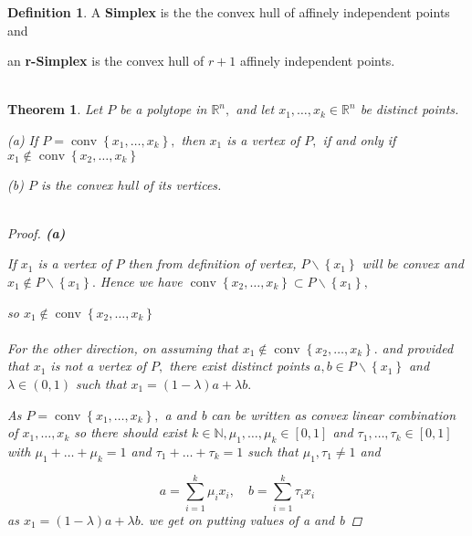 \documentclass[oneside]{book}
\newtheorem{theorem}{Theorem}[section]
\theoremstyle{definition}
\newtheorem{mydef}{Definition}[chapter]
\begin{document}
 



 

 
 
 
 
 
 




\begin{mydef}	
 A \textbf{Simplex} is the the convex hull of affinely independent points and \par 
  an \textbf{r-Simplex} is the convex hull of $r+ 1$ affinely independent points.
  \\\\
  \end{mydef} 


\begin{theorem}
\label{t:6}
Let $P$ be a polytope in $\mathbb{R}^{n},$ and let $x_{1}, \ldots, x_{k} \in \mathbb{R}^{n}$ be distinct points.\par
(a) If $P=\operatorname{conv}\left\{x_{1}, \ldots, x_{k}\right\},$ then $x_{1}$ is a vertex of $P,$ if and only if $x_{1} \notin \operatorname{conv}\left\{x_{2}, \ldots, x_{k}\right\}$ \par
(b) $P$ is the convex hull of its vertices. \\\\

\begin{proof}

\textbf{(a)}  \par 


 If  $x_{1}$ is a vertex of $P $ then  from definition of vertex, $P \backslash\left\{x_{1}\right\}$ will be convex and $x_{1} \notin P \backslash\left\{x_{1}\right\} .$ Hence we have  $\operatorname{conv}\left\{x_{2}, \ldots, x_{k}\right\} \subset P \backslash\left\{x_{1}\right\},$ 
 \par 
 so  $x_{1} \notin \operatorname{conv}\left\{x_{2}, \ldots, x_{k}\right\}$ \\\\
For the other direction, on assuming that $x_{1} \notin \operatorname{conv}\left\{x_{2}, \ldots, x_{k}\right\} .$ and provided that  $x_{1}$ is not a vertex of $P,$ there exist distinct points $a, b \in P \backslash\left\{x_{1}\right\}$ and $\lambda \in(0,1)$ such that $x_{1}=(1-\lambda) a+\lambda b .$ 

As  $P=\operatorname{conv}\left\{x_{1}, \ldots, x_{k}\right\},$ a and b can be written as convex linear combination of $x_{1},\ldots ,x_{k} $   so there should exist $k \in \mathbb{N}, \mu_{1}, \ldots, \mu_{k} \in[0,1]$ and $\tau_{1}, \ldots, \tau_{k} \in[0,1]$ with $\mu_{1}+\ldots+\mu_{k}=1$ and $\tau_{1}+\ldots+\tau_{k}=1$
such that $\mu_{1}, \tau_{1} \neq 1$ and \par
\begin{equation}
\label{eq37}
a=\sum_{i=1}^{k} \mu_{i} x_{i}, \quad b=\sum_{i=1}^{k} \tau_{i} x_{i}
\end{equation}  
as $x_{1}=(1-\lambda) a+\lambda b .$ we get on putting values of a and b 


\end{proof}
\end{theorem}
\end{document}
